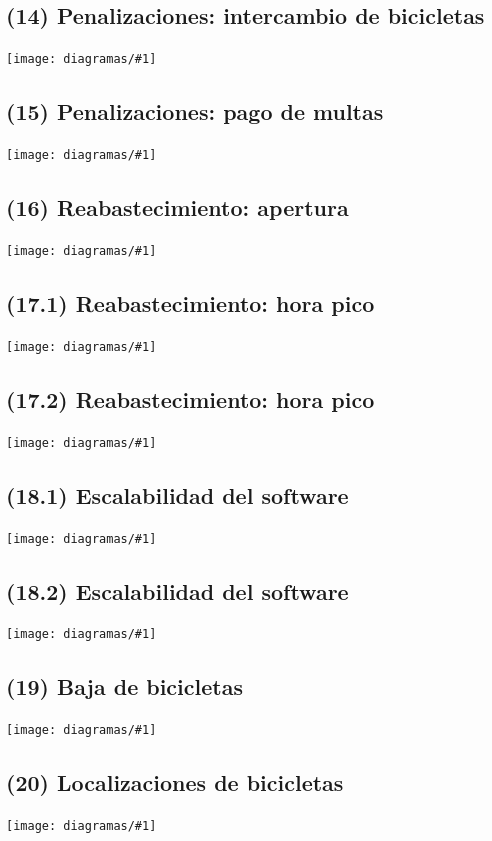 \documentclass[a4paper, 10pt, twoside]{article}
\newcommand{\diagramah}[1]{
  \texttt{[image: diagramas/\#1]}
}
\begin{document}
\subsection{(14)   Penalizaciones: intercambio de bicicletas}
\diagramah{objetivos-14}

\subsection{(15)   Penalizaciones: pago de multas}
\diagramah{objetivos-15}

\subsection{(16)   Reabastecimiento: apertura}
\diagramah{objetivos-16}

\subsection{(17.1) Reabastecimiento: hora pico}
\diagramah{objetivos-17.1}

\subsection{(17.2) Reabastecimiento: hora pico}
\diagramah{objetivos-17.2}

\subsection{(18.1) Escalabilidad del software}
\diagramah{objetivos-18.1}

\subsection{(18.2) Escalabilidad del software}
\diagramah{objetivos-18.2}

\subsection{(19)   Baja de bicicletas}
\diagramah{objetivos-19}

\subsection{(20)   Localizaciones de bicicletas}
\diagramah{objetivos-20}


\end{document}
